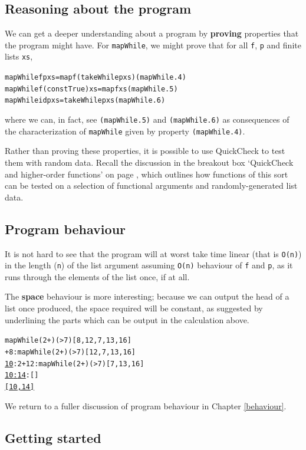 \subsection*{Reasoning about the program}

We can get a deeper understanding about a program by \textbf{proving} properties
that the program might have. For \texttt{mapWhile}, we might prove that for all
\texttt{f}, \texttt{p} and finite lists \texttt{xs},
\begin{alltt}
mapWhile f p xs            = map f (takeWhile p xs)\hfill(mapWhile.4)
mapWhile f (const True) xs = map f xs\hfill(mapWhile.5)
mapWhile id p xs           = takeWhile p xs\hfill(mapWhile.6)
\end{alltt}
where we can, in fact, see \texttt{(mapWhile.5)} and \texttt{(mapWhile.6)} as consequences of the
characterization of \texttt{mapWhile} given by property \texttt{(mapWhile.4)}. 

Rather than proving these properties, it is possible to use QuickCheck to test them with random data. Recall the discussion in the breakout box `QuickCheck and higher-order functions'  on page \pageref{QChofs}, which outlines how functions of this sort can be tested on a selection of functional arguments and randomly-generated list data.


\subsection*{Program behaviour}
It is not hard to see that the program will at worst take time linear (that is
\texttt{O(n)}) in the length (\texttt{n}) of the list argument assuming \texttt{O(n)}
behaviour of \texttt{f} and \texttt{p}, as it runs through the elements of the list
once, if at all.

The \textbf{space\/} behaviour is more interesting; because we can output the
head of a list once produced, the space required will be constant, as
suggested by underlining the parts which can be output in the calculation
above.
\begin{alltt}
mapWhile (2+) (>7) [8,12,7,13,16]
+8 : mapWhile (2+) (>7) [12,7,13,16] 
\step \underline{10} : 2+12 : mapWhile (2+) (>7) [7,13,16] 
\step \underline{10 : 14} : [] 
\step \underline{[10,14]}
\end{alltt}
We return to a fuller discussion of program behaviour in Chapter \ref{behaviour}.

\subsection*{Getting started}

